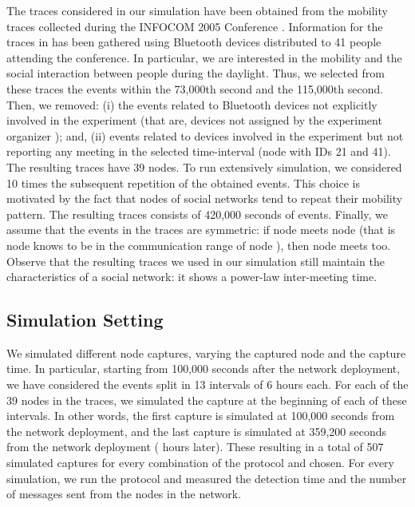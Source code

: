\documentclass{IEEEconf}
\begin{document}
The traces considered in our simulation have been obtained from
the mobility traces collected during the INFOCOM 2005 Conference \cite{CRAWDAD-INFOCOM}. Information for the traces in \cite{CRAWDAD-INFOCOM} has been gathered using Bluetooth devices distributed to 41 people attending the conference. In particular, we are interested in the mobility and the social interaction between people during the daylight. Thus, we selected from these traces the events within the 73,000th second and the 115,000th second. Then, we removed:  (i) the events related to Bluetooth devices not explicitly involved in the experiment (that are, devices not assigned by the experiment organizer \cite{CRAWDAD-INFOCOM}); and, (ii) events related to devices involved in the experiment but not reporting any meeting in the selected time-interval (node with IDs 21 and 41). The resulting traces have 39 nodes.
To run extensively simulation, we considered 10 times the subsequent repetition of the obtained events. This choice is motivated by the fact that nodes of social networks tend to repeat their mobility pattern.
The resulting traces consists of 420,000 seconds of events.
Finally, we assume that the events in the traces are symmetric: if node  meets node  (that is node  knows to be in the communication range of node ), then node  meets  too. Observe that the resulting traces we used in our simulation still maintain the characteristics of a social network: it shows a power-law inter-meeting time. 





\subsection{Simulation Setting}
\label{simSetting}
We simulated different node captures, varying the captured node and the capture time. In particular, starting from 100,000 seconds after the network deployment, we have considered the events split in 13 intervals of 6 hours each. For each of the 39 nodes in the traces, we simulated the capture at the beginning of each of these intervals. In other words, the first capture is simulated at 100,000 seconds from the network deployment, and the last capture is simulated at 359,200 seconds from the network deployment ( hours later). These resulting in a total of 507 simulated captures for every combination of the protocol and  chosen. For every simulation, we run the protocol and measured the detection time and the number of messages sent from the nodes in the network.
\end{document}
